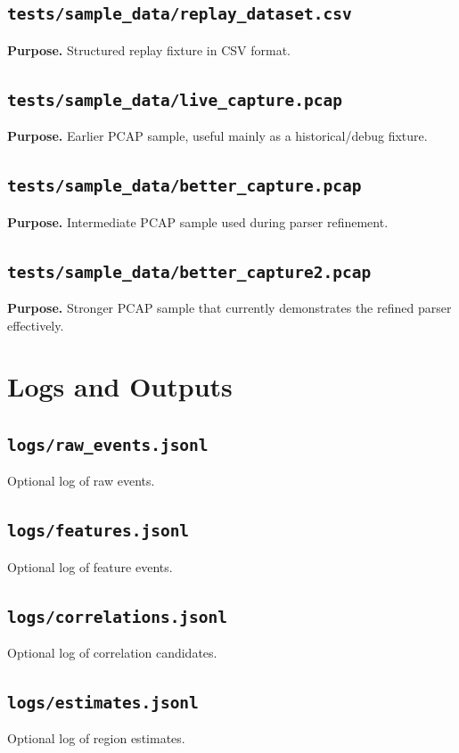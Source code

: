 \documentclass[12pt,a4paper]{report}
\begin{document}
\section{\texttt{tests/sample\_data/replay\_dataset.csv}}
\textbf{Purpose.} Structured replay fixture in CSV format.

\section{\texttt{tests/sample\_data/live\_capture.pcap}}
\textbf{Purpose.} Earlier PCAP sample, useful mainly as a historical/debug fixture.

\section{\texttt{tests/sample\_data/better\_capture.pcap}}
\textbf{Purpose.} Intermediate PCAP sample used during parser refinement.

\section{\texttt{tests/sample\_data/better\_capture2.pcap}}
\textbf{Purpose.} Stronger PCAP sample that currently demonstrates the refined parser effectively.

\chapter{Logs and Outputs}
\section{\texttt{logs/raw\_events.jsonl}}
Optional log of raw events.

\section{\texttt{logs/features.jsonl}}
Optional log of feature events.

\section{\texttt{logs/correlations.jsonl}}
Optional log of correlation candidates.

\section{\texttt{logs/estimates.jsonl}}
Optional log of region estimates.
\end{document}
